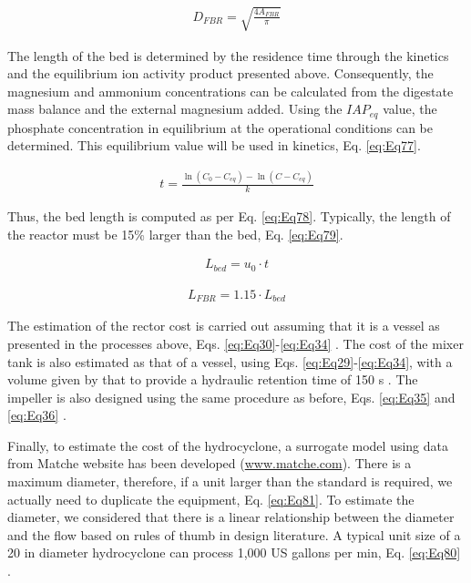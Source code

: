 \begin{refsection}[referencesCh2]
\begin{align}
	{D_{FBR}} = \sqrt {\frac{4{A_{FBR}}}{\pi}} \label{eq:Eq76}
\end{align}

The length of the bed is determined by the residence time through the kinetics and the equilibrium ion activity product presented above. Consequently, the magnesium and ammonium concentrations can be calculated from the digestate mass balance and the external magnesium added. Using the $IAP_{eq}$ value, the phosphate concentration in equilibrium at the operational conditions can be determined. This equilibrium value will be used in kinetics, Eq. \ref{eq:Eq77}.

\begin{align}
	t = \frac{\ln \left( {C_0} - {C_{eq}} \right) - \ln \left( C - {C_{eq}} \right)}{k} \label{eq:Eq77}
\end{align}

Thus, the bed length is computed as per Eq. \ref{eq:Eq78}. Typically, the length of the reactor must be 15\% larger than the bed, Eq. \ref{eq:Eq79}.

\begin{align}
	L_{bed} = u_0 \cdot t \label{eq:Eq78}
\end{align}

\begin{align}
	L_{FBR} = 1.15 \cdot L_{bed} \label{eq:Eq79}
\end{align}

The estimation of the rector cost is carried out assuming that it is a vessel as presented in the processes above, Eqs. \ref{eq:Eq30}-\ref{eq:Eq34} \citep{almena2016technoeconomic}. The cost of the mixer tank is also estimated as that of a vessel, using Eqs. \ref{eq:Eq29}-\ref{eq:Eq34}, with a volume given by that to provide a hydraulic retention time of 150 s \citep{szabo2008significance}. The impeller is also designed using the same procedure as before, Eqs. \ref{eq:Eq35} and \ref{eq:Eq36} \citep{walas1988chemical}.

Finally, to estimate the cost of the hydrocyclone, a surrogate model using data from Matche website has been developed \citep{Matche} (\url{www.matche.com}). There is a maximum diameter, therefore, if a unit larger than the standard is required, we actually need to duplicate the equipment, Eq. \ref{eq:Eq81}. To estimate the diameter, we considered that there is a linear relationship between the diameter and the flow based on rules of thumb in design literature. A typical unit size of a 20 in diameter hydrocyclone can process 1,000 US gallons per min, Eq. \ref{eq:Eq80} \citep{walas1988chemical}.


\end{refsection}
